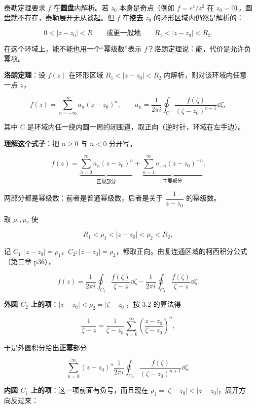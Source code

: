 \documentclass[11pt]{ctexart}
\let\origsubhdr\subhdr
\renewcommand{\subhdr}[1]{\par\needspace{4\baselineskip}\origsubhdr{#1}}
\let\orighdr\hdr
\renewcommand{\hdr}[2]{\par\needspace{9\baselineskip}\orighdr{#1}{#2}}
\begin{document}


泰勒定理要求 $f$ 在\textbf{圆盘}内解析。若 $z_0$ 本身是奇点（例如 $f=e^z/z^2$ 在 $z_0=0$），圆盘就不存在，泰勒展开无从谈起。但 $f$ 在\textbf{挖去} $z_0$ 的环形区域内仍然是解析的：

\[ 0<|z-z_0|<R\qquad\text{或更一般地}\qquad R_1<|z-z_0|<R_2 . \]

在这个环域上，能不能也用一个“幂级数”表示 $f$？洛朗定理说：能，代价是允许负幂项。


\textbf{洛朗定理}：设 $f(z)$ 在环形区域 $R_1<|z-z_0|<R_2$ 内解析，则对该环域内任意一点 $z$，

\[ f(z)=\sum_{n=-\infty}^{\infty}a_n(z-z_0)^n ,\qquad a_n=\frac{1}{2\pi i}\oint_C\frac{f(\zeta)}{(\zeta-z_0)^{n+1}}\dd\zeta , \]

其中 $C$ 是环域内任一绕内圆一周的闭围道，取正向（逆时针，环域在左手边）。

\textbf{理解这个式子}：把 $n\ge0$ 与 $n<0$ 分开写，

\[ f(z)=\underbrace{\sum_{n=0}^{\infty}a_n(z-z_0)^n}_{\text{正规部分}}+\underbrace{\sum_{n=1}^{\infty}a_{-n}(z-z_0)^{-n}}_{\text{主要部分}} . \]

两部分都是幂级数：前者是普通幂级数，后者是关于 $\dfrac{1}{z-z_0}$ 的幂级数。


取 $\rho_1,\rho_2$ 使

\[ R_1<\rho_1<|z-z_0|<\rho_2<R_2 , \]

记 $C_1:|z-z_0|=\rho_1$，$C_2:|z-z_0|=\rho_2$，都取正向。由复连通区域的柯西积分公式（第二章 p36），

\[ f(z)=\frac{1}{2\pi i}\oint_{C_2}\frac{f(\zeta)}{\zeta-z}\dd\zeta-\frac{1}{2\pi i}\oint_{C_1}\frac{f(\zeta)}{\zeta-z}\dd\zeta . \]

\textbf{外圆 $C_2$ 上的项}：$|z-z_0|<\rho_2=|\zeta-z_0|$，按 3.2 的算法得

\[ \frac{1}{\zeta-z}=\frac{1}{\zeta-z_0}\sum_{n=0}^{\infty}\left(\frac{z-z_0}{\zeta-z_0}\right)^n , \]

于是外圆积分给出\textbf{正幂}部分

\[ \sum_{n=0}^{\infty}(z-z_0)^n\frac{1}{2\pi i}\oint_{C_2}\frac{f(\zeta)}{(\zeta-z_0)^{n+1}}\dd\zeta . \]

\textbf{内圆 $C_1$ 上的项}：这一项前面有负号，而且现在 $\rho_1=|\zeta-z_0|<|z-z_0|$，展开方向反过来：
\end{document}
